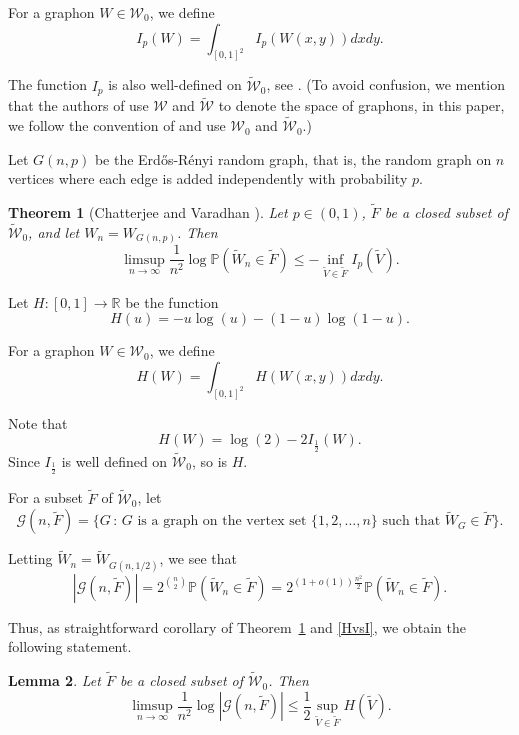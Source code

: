 \documentclass[11pt,a4paper]{article}
\theoremstyle{plain}
\newtheorem{theorem}{Theorem}[section]
\newtheorem{lemma}[theorem]{Lemma}
\theoremstyle{definition}
\begin{document}
For a graphon $W\in\mathcal{W}_0$, we define
\[I_p(W)=\int_{[0,1]^2} I_p(W(x,y))dxdy.\]

The function $I_p$ is also well-defined on $\widetilde{\mathcal{W}}_0$, see \cite[Lemma 2.1]{chatterjee2011large}. (To avoid confusion, we mention that the authors of \cite{chatterjee2011large} use $\mathcal{W}$ and $\widetilde{\mathcal{W}}$ to denote the space of graphons, in this paper, we follow the convention of \cite{lovasz2012large} and use $\mathcal{W}_0$ and $\widetilde{\mathcal{W}}_0$.)

Let $G(n,p)$ be the Erd\H{o}s-R\'enyi random graph, that is, the random graph on $n$
vertices where each edge is added independently with probability $p$.

\begin{theorem}[Chatterjee and Varadhan \cite{chatterjee2011large}]\label{largediv0} Let $p\in (0,1)$, $\widetilde{F}$ be a closed subset of $\widetilde{\mathcal{W}}_0$, and let $W_n=W_{G(n,p)}$. Then
\[\limsup_{n\to\infty} \frac{1}{n^2}\log \mathbb{P}(\widetilde{W}_n\in \widetilde{F})\le -\inf_{\widetilde{V}\in \widetilde{F}} I_p(\widetilde{V}).\]
\end{theorem}

Let $H:[0,1]\to \mathbb{R}$ be the function
\[H(u)=-u\log(u)- (1-u)\log(1-u).\]

For a graphon $W\in\mathcal{W}_0$, we define
\[H(W)=\int_{[0,1]^2} H(W(x,y))dxdy.\]

Note that \begin{equation}\label{HvsI}H(W)=\log(2)-2I_{\frac{1}2}(W).\end{equation} Since $I_{\frac{1}2}$ is well defined on $\widetilde{\mathcal{W}}_0$, so is $H$.

For a subset $\widetilde{F}$ of $\widetilde{\mathcal{W}}_0$, let
\[\mathcal{G}(n,\widetilde{F})=\{G\,:\,G\text{ is a graph on the vertex set }\{1,2,\dots,n\}\text{ such that } \widetilde{W}_G\in \widetilde{F}\}.\]

Letting $\widetilde{W}_n=\widetilde{W}_{G(n,1/2)}$, we see that
\[|\mathcal{G}(n,\widetilde{F})|=2^{{n}\choose{2}}\mathbb{P}(\widetilde{W}_n\in \widetilde{F})=2^{(1+o(1))\frac{n^2}2}\mathbb{P}(\widetilde{W}_n\in \widetilde{F}).\]

Thus, as straightforward corollary of Theorem~\ref{largediv0} and \eqref{HvsI}, we obtain the following statement.
\begin{lemma}\label{logcount}
Let $\widetilde{F}$ be a closed subset of $\widetilde{\mathcal{W}}_0$. Then
\[\limsup_{n\to\infty} \frac{1}{n^2}\log |\mathcal{G}(n,\widetilde{F})|\le \frac{1}2\sup_{\widetilde{V}\in \widetilde{F}} H(\widetilde{V}).\]

\end{lemma}
\end{document}

